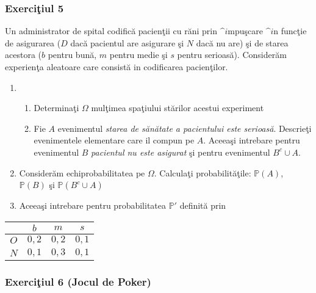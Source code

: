 \documentclass[]{article}
\providecommand{\tightlist}{%
  \setlength{\itemsep}{0pt}\setlength{\parskip}{0pt}}
\def\Om{\Omega}
\def\PP{{\mathbb P}}
\begin{document}
\subsubsection{\texorpdfstring{Exerci\c tiul
5}{Exerciiul 5}}\label{exerciiul-5}

Un administrator de spital codific\u a pacien\c tii cu r\u ani prin
\(\^i\)mpu\c scare \(\^i\)n func\c tie de asigurarea (\(D\) dac\u a
pacientul are asigurare \c si \(N\) dac\u a nu are) \c si de starea
acestora (\(b\) pentru bun\u a, \(m\) pentru medie \c si \(s\) pentru
serioas\u a). Consider\u am experien\c ta aleatoare care consist\u a in
codificarea pacien\c tilor.

\begin{enumerate}
\def\labelenumi{\arabic{enumi}.}
\item
  \begin{enumerate}
  \def\labelenumii{\alph{enumii})}
  \tightlist
  \item
    Determina\c ti \(\Om\) mul\c timea spa\c tiului st\u arilor acestui
    experiment
  \item
    Fie \(A\) evenimentul \emph{starea de s\u an\u atate a pacientului
    este serioas\u a}. Descrie\c ti evenimentele elementare care il
    compun pe \(A\). Aceea\c si intrebare pentru evenimentul \(B\)
    \emph{pacientul nu este asigurat} \c si pentru evenimentul
    \(B^c\cup A\).
  \end{enumerate}
\item
  Consider\u am echiprobabilitatea pe \(\Om\). Calcula\c ti
  probabilit\u a\c tile: \(\PP(A)\), \(\PP(B)\) \c si \(\PP(B^c\cup A)\)
\item
  Aceea\c si intrebare pentru probabilitatea \(\PP'\) definit\u a prin
\end{enumerate}

\begin{center}
    \begin{tabular}{c|ccc}
        & $b$ & $m$ & $s$ \\
      \hline
      $O$ & $0,2$ & $0,2$ & $0,1$ \\
      $N$ & $0,1$ & $0,3$ & $0,1$ \\
    \end{tabular}
  \end{center}

\subsubsection{\texorpdfstring{Exerci\c tiul 6 (Jocul de
Poker)}{Exerciiul 6 (Jocul de Poker)}}\label{exerciiul-6-jocul-de-poker}
\end{document}

